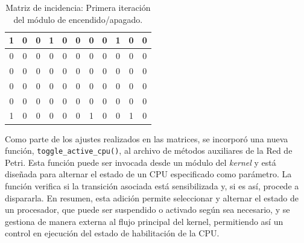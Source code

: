 \begin{table}[H]
    \centering
    \begin{tabular}{|c|c|c|c|c|c|c|c|c|c|c|}
        \hline
        1                      & 0                      & 0                      & 1                      & 0                      & 0                      & 0                      & 0                      & 1                      & \cellcolor{lightgray}0 & \cellcolor{lightgray}0 \\
        \hline
        0                      & 0                      & 0                      & 0                      & 0                      & 0                      & 0                      & 0                      & 0                      & \cellcolor{lightgray}0 & \cellcolor{lightgray}0 \\
        \hline
        0                      & 0                      & 0                      & 0                      & 0                      & 0                      & 0                      & 0                      & 0                      & \cellcolor{lightgray}0 & \cellcolor{lightgray}0 \\
        \hline
        0                      & 0                      & 0                      & 0                      & 0                      & 0                      & 0                      & 0                      & 0                      & \cellcolor{lightgray}0 & \cellcolor{lightgray}0 \\
        \hline
        0                      & 0                      & 0                      & 0                      & 0                      & 0                      & 0                      & 0                      & 0                      & \cellcolor{lightgray}0 & \cellcolor{lightgray}0 \\
        \hline
        \cellcolor{lightgray}1 & \cellcolor{lightgray}0 & \cellcolor{lightgray}0 & \cellcolor{lightgray}0 & \cellcolor{lightgray}0 & \cellcolor{lightgray}0 & \cellcolor{lightgray}1 & \cellcolor{lightgray}0 & \cellcolor{lightgray}0 & \cellcolor{lightgray}1 & \cellcolor{lightgray}0 \\
        \hline
    \end{tabular}
    \caption{Matriz de incidencia: Primera iteración del módulo de encendido/apagado.}
    \label{tabla:matriz_incidencia_post}
\end{table}

Como parte de los ajustes realizados en las matrices, se incorporó una nueva función, \verb|toggle_active_cpu()|, al archivo de métodos auxiliares de la Red de Petri. Esta función puede ser invocada desde un módulo del \textit{kernel} y está diseñada para alternar el estado de un CPU especificado como parámetro. La función verifica si la transición asociada está sensibilizada y, si es así, procede a dispararla. En resumen, esta adición permite seleccionar y alternar el estado de un procesador, que puede ser suspendido o activado según sea necesario, y se gestiona de manera externa al flujo principal del kernel, permitiendo así un control en ejecución del estado de habilitación de la CPU.\par

